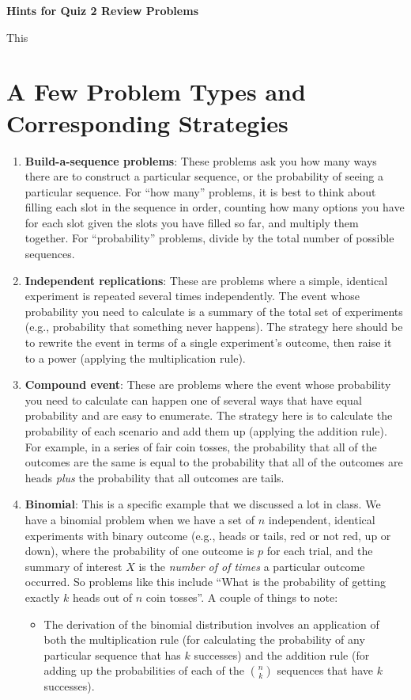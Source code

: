 \documentclass[11pt]{article}
\begin{document}
\centerline{\textbf{Hints for Quiz 2 Review Problems}}
This 

\section*{A Few Problem Types and Corresponding Strategies}
\begin{enumerate}
\item {\bf Build-a-sequence problems}: These problems ask you how many ways there are to construct a particular sequence, or the probability of seeing a particular sequence. For ``how many'' problems, it is best to think about filling each slot in the sequence in order, counting how many options you have for each slot given the slots you have filled so far, and multiply them together. For ``probability'' problems, divide by the total number of possible sequences.
\item {\bf Independent replications}: These are problems where a simple, identical experiment is repeated several times independently. The event whose probability you need to calculate is a summary of the total set of experiments (e.g., probability that something never happens). The strategy here should be to rewrite the event in terms of a single experiment's outcome, then raise it to a power (applying the multiplication rule).
\item {\bf Compound event}: These are problems where the event whose probability you need to calculate can happen one of several ways that have equal probability and are easy to enumerate. The strategy here is to calculate the probability of each scenario and add them up (applying the addition rule). For example, in a series of fair coin tosses, the probability that all of the outcomes are the same is equal to the probability that all of the outcomes are heads \emph{plus} the probability that all outcomes are tails.
\item {\bf Binomial}: This is a specific example that we discussed a lot in class. We have a binomial problem when we have a set of $n$ independent, identical experiments with binary outcome (e.g., heads or tails, red or not red, up or down), where the probability of one outcome is $p$ for each trial, and the summary of interest $X$ is the \emph{number of of times} a particular outcome occurred. So problems like this include ``What is the probability of getting exactly $k$ heads out of $n$ coin tosses''. A couple of things to note:
    \begin{itemize}
    \item The derivation of the binomial distribution involves an application of both the multiplication rule (for calculating the probability of any particular sequence that has $k$ successes) and the addition rule (for adding up the probabilities of each of the ${n \choose k}$ sequences that have $k$ successes).

\end{itemize}
\end{enumerate}
\end{document}
